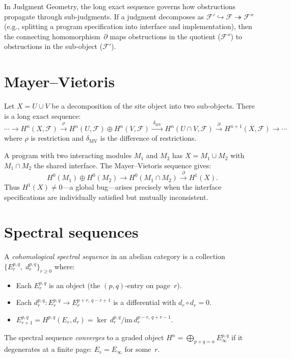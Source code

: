 \begin{remark}
In Judgment Geometry, the long exact sequence governs how obstructions
propagate through sub-judgments.  If a judgment decomposes as
$\mathcal{F}' \hookrightarrow \mathcal{F} \twoheadrightarrow
\mathcal{F}''$ (e.g., splitting a program specification into interface
and implementation), then the connecting homomorphism~$\partial$ maps
obstructions in the quotient ($\mathcal{F}''$) to obstructions in the
sub-object ($\mathcal{F}'$).
\end{remark}

\section{Mayer--Vietoris}
\label{sec:mayer-vietoris}

\begin{theorem}
\label{thm:mv}
Let $X = U \cup V$ be a decomposition of the site object into two
sub-objects.  There is a long exact sequence:
\[
  \cdots \to H^n(X,\mathcal{F})
  \xrightarrow{\;\rho\;}
  H^n(U,\mathcal{F}) \oplus H^n(V,\mathcal{F})
  \xrightarrow{\;\delta_{\mathrm{MV}}\;}
  H^n(U \cap V,\mathcal{F})
  \xrightarrow{\;\partial\;}
  H^{n+1}(X,\mathcal{F}) \to \cdots
\]
where $\rho$ is restriction and $\delta_{\mathrm{MV}}$ is the
difference of restrictions.
\end{theorem}

\begin{example}
\label{ex:modular-mv}
A program with two interacting modules $M_1$ and $M_2$ has
$X = M_1 \cup M_2$ with $M_1 \cap M_2$ the shared interface.  The
Mayer--Vietoris sequence gives:
\[
  H^0(M_1) \oplus H^0(M_2) \to H^0(M_1 \cap M_2)
  \xrightarrow{\;\partial\;} H^1(X).
\]
Thus $H^1(X) \neq 0$---a global bug---arises precisely when the
interface specifications are individually satisfied but mutually
inconsistent.
\end{example}

\section{Spectral sequences}
\label{sec:spectral}

\begin{definition}
\label{def:spectral}
A \emph{cohomological spectral sequence} in an abelian category is a
collection $\{E_r^{p,q},\; d_r^{p,q}\}_{r \geq 0}$ where:
\begin{itemize}[nosep]
\item Each $E_r^{p,q}$ is an object (the $(p,q)$-entry on
  page~$r$).
\item Each $d_r^{p,q} : E_r^{p,q} \to E_r^{p+r,\, q-r+1}$ is a
  differential with $d_r \circ d_r = 0$.
\item $E_{r+1}^{p,q} = H^{p,q}(E_r, d_r) =
  \ker\, d_r^{p,q} / \mathrm{im}\, d_r^{p-r,\, q+r-1}$.
\end{itemize}
The spectral sequence \emph{converges} to a graded object
$H^n = \bigoplus_{p+q=n} E_\infty^{p,q}$ if it degenerates at a
finite page: $E_r = E_\infty$ for some~$r$.
\end{definition}

